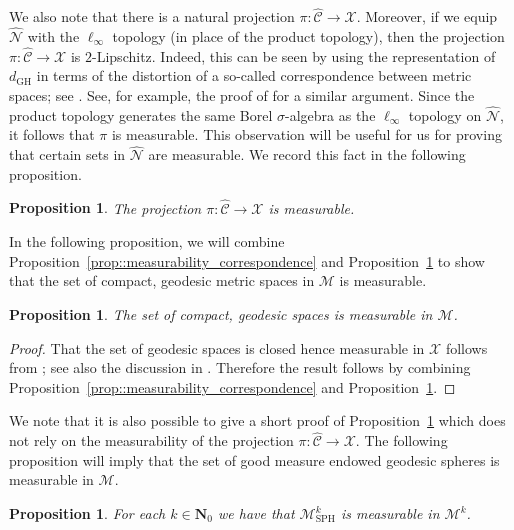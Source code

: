 \documentclass[JEP,XML,SOM,Unicode]{cedram}
\let\mathcal\mathscr
\theoremstyle{plain}
\numberwithin{theorem}{section}
\newtheorem{proposition}[theorem]{Proposition}
\theoremstyle{definition}
\newcommand\gmsspace{{\mathcal M}_{\mathrm{SPH}}}
\newcommand\mmspace{{\mathcal M}}
\newcommand{\matrixmspace}{\mathcal N}
\newcommand{\compactmatrix}{\mathcal C}
\newcommand{\N}{\mathbf{N}}
\newcommand{\gh}{{\mathcal X}}
\newcommand{\dgh}{d_{\mathrm {GH}}}
\let\wh\widehat
\begin{document}
We also note that there is a natural projection $\pi \colon \wh{\compactmatrix} \to \gh$. Moreover, if we equip~$\wh{\matrixmspace}$ with the $\ell_\infty$ topology (in place of the product topology), then the projection $\pi \colon \wh{\compactmatrix} \to \gh$ is $2$-Lipschitz. Indeed, this can be seen by using the representation of $\dgh$ in terms of the distortion of a so-called correspondence between metric spaces; see \cite[Chap.\,27]{villanibook}. See, for example, the proof of \cite[Prop.\,3.3.3]{miermontstflour} for a similar argument. Since the product topology generates the same Borel $\sigma$-algebra as the $\ell_\infty$ topology on $\wh{\matrixmspace}$, it follows that $\pi$ is measurable. This observation will be useful for us for proving that certain sets in $\wh{\matrixmspace}$ are measurable. We record this fact in the following proposition.

\begin{proposition}
\label{prop::gm_measurable}
The projection $\pi \colon \wh{\compactmatrix} \to \gh$ is measurable.
\end{proposition}

In the following proposition, we will combine Proposition~\ref{prop::measurability_correspondence} and Proposition~\ref{prop::gm_measurable} to show that the set of compact, geodesic metric spaces in $\mmspace$ is measurable.

\begin{proposition}
\label{prop::geodesic_closed}
The set of compact, geodesic spaces is measurable in $\mmspace$.
\end{proposition}
\begin{proof}
That the set of geodesic spaces is closed hence measurable in $\gh$ follows from \cite[Th.\,27.9]{villanibook}; see also the discussion in \cite[Chap.\,7.5]{courseinmetricgeometry}. Therefore the result follows by combining Proposition~\ref{prop::measurability_correspondence} and Proposition~\ref{prop::gm_measurable}.
\end{proof}

We note that it is also possible to give a short proof of Proposition~\ref{prop::geodesic_closed} which does not rely on the measurability of the projection $\pi \colon \wh{\compactmatrix} \to \gh$. The following proposition will imply that the set of good measure endowed geodesic spheres is measurable in $\mmspace$.

\begin{proposition}
\label{prop::geodesic_spheres_measurable}
For each $k \in \N_0$ we have that $\gmsspace^k$ is measurable in $\mmspace^k$.
\end{proposition}
\end{document}
